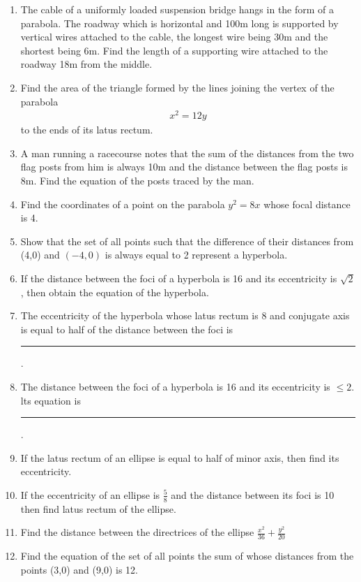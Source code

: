 \begin{enumerate}[label=\thesubsection.\arabic*,ref=\thesubsection.\theenumi]
\item  The cable of a uniformly loaded suspension bridge hangs in the form of a parabola. The roadway which is horizontal and 100m long is supported by vertical wires attached to the cable, the longest wire being 30m and the shortest being 6m. Find the length of a supporting wire attached to the roadway 18m from the middle.
\label{chapters/11/11/5/3}
    \item Find the area of the triangle formed by the lines joining the vertex 
    of the parabola 
    \begin{align}
        x^2 = 12y
        \label{eq:chapters/11/11/5/6/parabola}
    \end{align}
    to the ends of its latus rectum.
\label{chapters/11/11/5/6}
\item A man running a racecourse notes that the sum of the distances from the two flag posts from him is always 10m and the distance between the flag posts is 8m. Find the equation of the posts traced by the man. 
\label{chapters/11/11/5/7}
 \item Find the coordinates of a point on the parabola $y^2=8x$ whose focal distance is 4.
\item Show that the set of all points such that the difference of their distances from (4,0) and $(-4,0)$ is always equal to 2 represent a hyperbola.
\item If the distance between the foci of a hyperbola is 16 and its eccentricity is $\sqrt{2}$, then obtain the equation of the hyperbola.
\item The eccentricity of the hyperbola whose latus rectum is 8 and conjugate axis is equal to half of the distance between the foci is \rule{1cm}{0.1pt}.
\item The distance between the foci of a hyperbola is 16 and its eccentricity is $\le{2}$. lts equation is \rule{1cm}{0.1pt}.
 \item If the latus rectum of an ellipse is equal to half of minor axis, then find its eccentricity.
 \item If the eccentricity of an ellipse is $\frac{5}{8}$ and  the distance between its foci is 10 then find latus rectum of the ellipse.
 \item Find the distance between the directrices of the ellipse $\frac{x^2}{36}+\frac{y^2}{20}$
\item Find the equation of the set of all points the sum of whose distances  from the points (3,0) and (9,0) is 12.

\end{enumerate}
